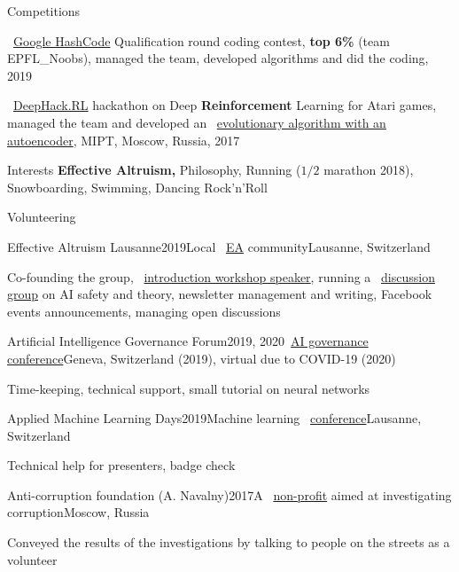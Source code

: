 \documentclass{resume} %
\newcommand*{\img}[1]{%
	\raisebox{-.02\baselineskip}{%
		\texttt{[image: \#1]}%
	}%
}
\newcommand*{\emoji}[1]{\img{./emoji/#1.png}}
\newcommand{\mylink}{{\color{gray}\faExternalLink}}
\begin{document}
\begin{rSection}{Competitions}
\vspace{-1em}
\item \emoji{flag-ch} \mylink~\href{https://hashcodejudge.withgoogle.com/scoreboard}{Google HashCode} Qualification round coding contest, {\bf top 6\%} (team EPFL\_Noobs), managed the team, developed algorithms and did the coding, 2019\vspace{1em}\\
\emoji{flag-ru}
\mylink~\href{http://web.archive.org/web/20170224094223/http://rl.deephack.me/}{DeepHack.RL} hackathon on Deep {\bf Reinforcement} Learning for Atari games, managed the team and developed an \mylink~\href{https://github.com/sergeivolodin/deephack.rl}{evolutionary algorithm with an autoencoder}, MIPT, Moscow, Russia, 2017
\end{rSection}

\begin{rSection}{Interests}
	{\bf Effective Altruism,} Philosophy, Running ($1/2$ marathon 2018), Snowboarding, Swimming, Dancing Rock'n'Roll
\end{rSection}

\begin{rSection}{Volunteering}
\begin{rSubsection}{Effective Altruism Lausanne}{2019}{Local \mylink~\href{https://effectivealtruism.org}{EA} community}{Lausanne, Switzerland \emoji{flag-ch}}
	\item[] Co-founding the group, \mylink~\href{http://eageneva.org/about#our-members}{introduction workshop speaker}, running a \mylink~\href{https://docs.google.com/document/d/1prejPACr08nUVztHRBc4nj4upKtDc9_EJOYi1alWuYM/edit?usp=sharing}{discussion group} on AI safety and theory, newsletter management and writing, Facebook events announcements, managing open discussions
\end{rSubsection}

\begin{rSubsection}{Artificial Intelligence Governance Forum}{2019, 2020}{\mylink~\href{https://ai-gf.com/}{AI governance conference}}{Geneva, Switzerland (2019), virtual due to COVID-19 (2020) \emoji{flag-ch}}
	\item[] Time-keeping, technical support, small tutorial on neural networks
\end{rSubsection}

\begin{rSubsection}{Applied Machine Learning Days}{2019}{Machine learning \mylink~\href{https://www.appliedmldays.org/}{conference}}{Lausanne, Switzerland \emoji{flag-ch}}
\item[]	Technical help for presenters, badge check
\end{rSubsection}
	\begin{rSubsection}{Anti-corruption foundation (A. Navalny)}{2017}{A \mylink~\href{https://en.wikipedia.org/wiki/Anti-Corruption_Foundation}{non-profit} aimed at investigating corruption}{Moscow, Russia \emoji{flag-ru}}
\item[] Conveyed the results of the investigations by talking to people on the streets as a volunteer
	\end{rSubsection}
\end{rSection}
\end{document}
